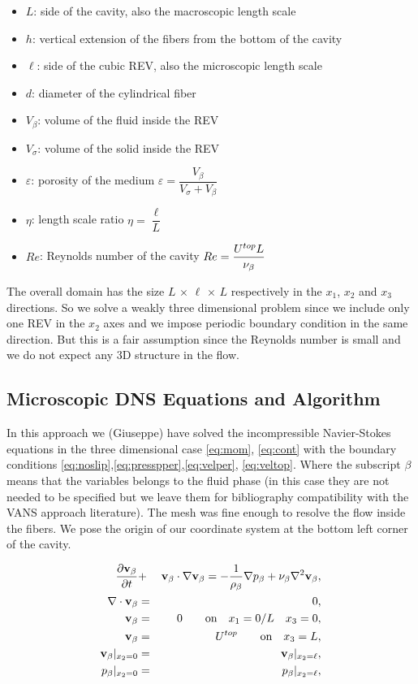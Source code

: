 \begin{itemize}
	\item $L$: side of the cavity, also the macroscopic length scale
	\item $h$: vertical extension of the fibers from the bottom of the cavity 
	\item $\ell$: side of the cubic REV, also the microscopic length scale
	\item $d$: diameter of the cylindrical fiber
	\item $V_{\beta}$: volume of the fluid inside the REV
	\item $V_{\sigma}$: volume of the solid inside the REV
	\item $\varepsilon$: porosity of the medium $\varepsilon = \dfrac{V_{\beta}}{V_{\sigma} +V_{\beta}}$
	\item $\eta$: length scale ratio $\eta = \dfrac{\ell}{L}$
	\item $Re$: Reynolds number of the cavity $Re = \dfrac{U^{top} L}{\nu_{\beta}}$
\end{itemize}

The overall domain has the size $L \, \times \, \ell \, \times \, L$ respectively in the $x_1$, $x_2$ and $x_3$ directions.
So we solve a weakly three dimensional problem since we include only one REV in the $x_2$ axes and we impose periodic boundary condition in the same direction.
But this is a fair assumption since the Reynolds number is small and we do not expect any 3D structure in the flow.

\subsection{Microscopic DNS Equations and Algorithm}

In this approach we (Giuseppe) have solved the incompressible Navier-Stokes equations in the three dimensional case \eqref{eq:mom}, \eqref{eq:cont} with the boundary conditions \eqref{eq:noslip},\eqref{eq:presspper},\eqref{eq:velper}, \eqref{eq:veltop}.
Where the subscript $\beta$ means that the variables belongs to the fluid phase (in this case they are not needed to be specified but we leave them for bibliography compatibility with the VANS approach literature).
The mesh was fine enough to resolve the flow inside the fibers.
We pose the origin of our coordinate system at the bottom left corner of the cavity. 

\begin{eqnarray}
\dfrac{\partial \textbf{v}_{\beta}}{\partial t} &+& \textbf{v}_{\beta} \cdot \nabla \textbf{v}_{\beta} = -\frac{1}{\rho_{\beta}} \nabla p_{\beta} + \nu_{\beta} \nabla^2  \textbf{v}_{\beta}, \label{eq:mom}\\
\nabla \cdot \textbf{v}_{\beta} &=& 0, \label{eq:cont}\\
\textbf{v}_{\beta} &=& 0 \qquad \text{on} \quad x_1 = 0/L \quad x_3 = 0, \label{eq:noslip}\\
\textbf{v}_{\beta} &=& U^{top} \qquad \text{on} \quad x_3 = L, \label{eq:veltop}\\
\textbf{v}_{\beta}|_{x_2 = 0} &=& \textbf{v}_{\beta}|_{x_2 = \ell}, \label{eq:velper}\\
p_{\beta}|_{x_2 = 0} &=& p_{\beta}|_{x_2 = \ell}, \label{eq:presspper}
\end{eqnarray}

